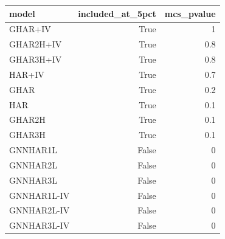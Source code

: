 \begin{tabular}{lrr}
\toprule
model & included_at_5pct & mcs_pvalue \\
\midrule
GHAR+IV & True & 1 \\
GHAR2H+IV & True & 0.8 \\
GHAR3H+IV & True & 0.8 \\
HAR+IV & True & 0.7 \\
GHAR & True & 0.2 \\
HAR & True & 0.1 \\
GHAR2H & True & 0.1 \\
GHAR3H & True & 0.1 \\
GNNHAR1L & False & 0 \\
GNNHAR2L & False & 0 \\
GNNHAR3L & False & 0 \\
GNNHAR1L-IV & False & 0 \\
GNNHAR2L-IV & False & 0 \\
GNNHAR3L-IV & False & 0 \\
\bottomrule
\end{tabular}
